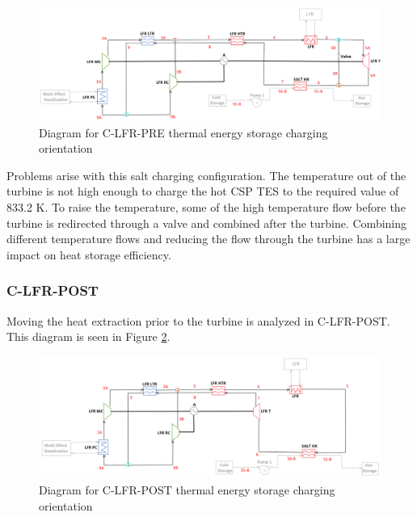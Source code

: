 \begin{figure}[H]
    \widefigure
    \includegraphics[width=\linewidth]{Definitions/c-lfr-pre.pdf}
    \caption{Diagram for C-LFR-PRE thermal energy storage charging orientation\label{c-lfr-pre}}
\end{figure}
\begin{paracol}{2}
\linenumbers
\switchcolumn

Problems arise with this salt charging configuration. The temperature out of the turbine is not high enough to charge the hot CSP TES to the required value of 833.2 K. To raise the temperature, some of the high temperature flow before the turbine is redirected through a valve and combined after the turbine. Combining different temperature flows and reducing the flow through the turbine has a large impact on heat storage efficiency. 



\subsubsection{C-LFR-POST} %

Moving the heat extraction prior to the turbine is analyzed in C-LFR-POST. This diagram is seen in Figure \ref{c-lfr-post}.

\end{paracol}
\begin{figure}[H]
    \widefigure
    \includegraphics[width=\linewidth]{Definitions/c-lfr-post.pdf}
    \caption{Diagram for C-LFR-POST thermal energy storage charging orientation\label{c-lfr-post}}
\end{figure}
